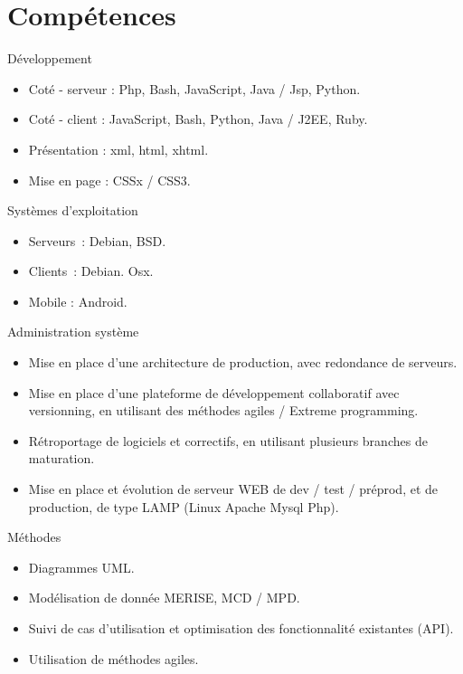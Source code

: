 \documentclass[print]{GuillaumeSeren-cv}
\begin{document}
\section{Compétences}
\begin{entrylist}
  \entryBul
  {Développement}
  {}
  {}
  {}
  {
     \begin{itemize}[leftmargin=*]
       \setlength\itemsep{0pt}
       \item Coté - serveur : Php, Bash, JavaScript, Java / Jsp, Python.
       \item Coté - client : JavaScript, Bash, Python, Java / J2EE, Ruby.
       \item Présentation : xml, html, xhtml.
       \item Mise en page : CSSx / CSS3.
     \end{itemize}
     }

  \entryBul
  {Systèmes d'exploitation}
  {}
  {}
  {}
  {
     \begin{itemize}[leftmargin=*]
       \setlength\itemsep{0pt}
       \item Serveurs : Debian, BSD.
       \item Clients : Debian. Osx.
       \item Mobile : Android.
     \end{itemize}
     }

  \entryBul
  {Administration système}
  {}
  {}
  {}
  {
     \begin{itemize}[leftmargin=*]
       \setlength\itemsep{0pt}
       \item Mise en place d'une architecture de production, avec redondance de serveurs.
       \item Mise en place d'une plateforme de développement collaboratif avec versionning, en utilisant des méthodes agiles / Extreme programming.
       \item Rétroportage de logiciels et correctifs, en utilisant plusieurs branches de maturation.
       \item Mise en place et évolution de serveur WEB de dev / test / préprod, et de production, de type LAMP (Linux Apache Mysql Php).
     \end{itemize}
  }

  \entryBul
  {Méthodes}
  {}
  {}
  {}
  {
     \begin{itemize}[leftmargin=*]
       \setlength\itemsep{0pt}
       \item Diagrammes UML.
       \item Modélisation de donnée MERISE, MCD / MPD.
       \item Suivi de cas d'utilisation et optimisation des fonctionnalité existantes (API).
       \item Utilisation de méthodes agiles.
     \end{itemize}
     }


\end{entrylist}
\end{document}
